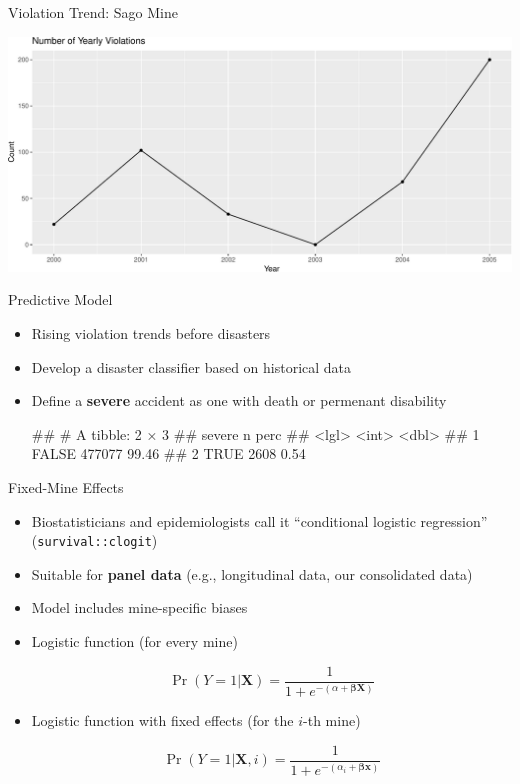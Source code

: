 \documentclass[]{beamer}
\providecommand{\tightlist}{%
  \setlength{\itemsep}{0pt}\setlength{\parskip}{0pt}}
\let\oldverbatim\verbatim
\let\endoldverbatim\endverbatim
\renewenvironment{verbatim}{\footnotesize\oldverbatim}{\endoldverbatim}
\begin{document}
\begin{frame}{Violation Trend: Sago Mine}

\begin{center}\includegraphics{presentation_slides_files/figure-beamer/sago-1} \end{center}

\end{frame}

\begin{frame}[fragile]{Predictive Model}

\begin{itemize}[<+->]
\tightlist
\item
  Rising violation trends before disasters
\item
  Develop a disaster classifier based on historical data
\item
  Define a \textbf{severe} accident as one with death or permenant
  disability 


\begin{verbatim}
## # A tibble: 2 × 3
##   severe      n  perc
##    <lgl>  <int> <dbl>
## 1  FALSE 477077 99.46
## 2   TRUE   2608  0.54
\end{verbatim}
\end{itemize}
\end{frame}

\begin{frame}[fragile]{Fixed-Mine Effects}

\begin{itemize}[<+->]
\tightlist
\item
  Biostatisticians and epidemiologists call it ``conditional logistic
  regression'' (\texttt{survival::clogit})
\item
  Suitable for \textbf{panel data} (e.g., longitudinal data, our
  consolidated data)
\item
  Model includes mine-specific biases
\item
  Logistic function (for every mine)


\[\Pr(Y=1|\mathbf{X}) = \frac{1}{1+e^{-(\alpha+\boldsymbol\beta\mathbf{X})}}\]


\item
  Logistic function with fixed effects (for the \(i\)-th mine)


\[\Pr(Y=1|\mathbf{X},i) = \frac{1}{1+e^{-(\alpha_i+\boldsymbol\beta\mathbf{x})}}\]
\end{itemize}

\end{frame}
\end{document}
